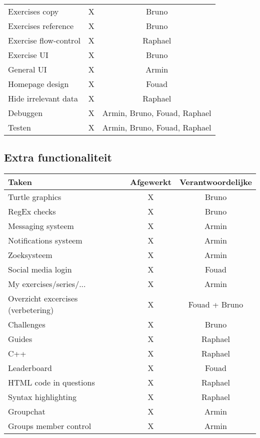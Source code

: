 \begin{tabular}{| l | c | c |}
    Exercises copy          &   X   &   Bruno   \\
    Exercises reference     &   X   &   Bruno   \\
    Exercise flow-control   &   X   &   Raphael \\
    Exercise UI             &   X   &   Bruno   \\
    General UI              &   X   &   Armin   \\
    Homepage design         &   X   &   Fouad   \\
    Hide irrelevant data    &   X   &   Raphael \\
    \hline
    Debuggen                &   X   &   Armin, Bruno, Fouad, Raphael    \\
    Testen                  &   X   &   Armin, Bruno, Fouad, Raphael    \\
    \hline
\end{tabular}


\subsection{Extra functionaliteit}
\begin{tabular}{| l | c | c |}
    \hline
    Taken   &   Afgewerkt               &   Verantwoordelijke \\
    \hline \hline
    Turtle graphics                     &   X   &   Bruno   \\
    RegEx checks                        &   X   &   Bruno   \\
    Messaging systeem                   &   X   &   Armin   \\
    Notifications systeem               &   X   &   Armin   \\
    Zoeksysteem                         &   X   &   Armin   \\
    Social media login                  &   X   &   Fouad   \\
    My exercises/series/...             &   X   &   Armin   \\
    Overzicht excercises (verbetering)  &   X   &   Fouad + Bruno   \\
    Challenges                          &   X   &   Bruno   \\
    Guides                              &   X   &   Raphael \\
    C++                                 &   X   &   Raphael  \\
    Leaderboard                         &   X   &   Fouad   \\
    HTML code in questions              &   X   &   Raphael \\
    Syntax highlighting                 &   X   &   Raphael \\
    Groupchat                           &   X   &   Armin\\
    Groups member control               &   X   &   Armin\\
    \hline
\end{tabular}
